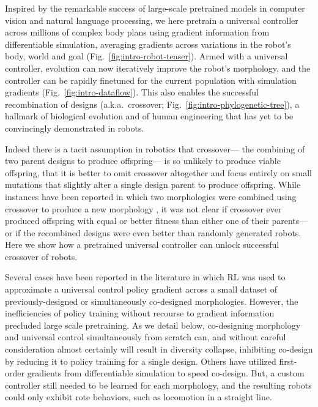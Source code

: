 Inspired by the remarkable success of large-scale pretrained models in computer vision and natural language processing, we here pretrain a universal controller across millions of complex body plans using gradient information from differentiable simulation, 
averaging gradients across variations in the robot's body, world and goal (Fig.~\ref{fig:intro-robot-teaser}).
% 
Armed with a universal controller, evolution can now iteratively improve the robot's morphology, 
and the controller can be rapidly finetuned for the current population with simulation gradients (Fig.~\ref{fig:intro-dataflow}).
This also enables the successful recombination of designs (a.k.a.~crossover; Fig.~\ref{fig:intro-phylogenetic-tree}),
a hallmark of biological evolution 
and of human engineering that has yet to be convincingly demonstrated in robots.

Indeed there is a tacit assumption in robotics 
that crossover---%
the combining of two parent designs to produce offspring---%
is so unlikely to produce viable offspring, 
that it is better to omit crossover altogether 
and focus entirely on small mutations 
that slightly alter a single design parent to produce offspring.
% 
While instances have been reported in which two morphologies were combined using crossover to produce a new morphology
\cite{sims1994competition,bongard2001repeated,hiller2010evolving,strgar2024evolution},
it was not clear if crossover ever produced offspring with equal or better fitness than either one of their parents---or if the recombined designs were even better than randomly generated robots.
Here we show how a pretrained universal controller can unlock successful crossover of robots.


Several cases have been reported in the literature in which RL was used to approximate a universal control policy gradient across a small dataset of
previously-designed 
\cite{huang2020one,gupta2022metamorph,bohlinger2024one}
or 
simultaneously co-designed \cite{wang2023preco,li2025generating}
morphologies.
However, the inefficiencies of policy training without recourse to gradient information precluded large scale pretraining.
% 
As we detail below, co-designing morphology and universal control simultaneously from scratch can, and without careful consideration almost certainly will 
result in diversity collapse, inhibiting co-design by reducing it to policy training for a single design.
%
Others
\cite{ma2021diffaqua,matthews2023efficient,yuhn20234d,cochevelou2023differentiable,strgar2024evolution}
have utilized first-order gradients from differentiable simulation 
to speed co-design.
But, a custom controller still needed to be learned for each morphology,
and the resulting robots could only exhibit rote behaviors,
such as locomotion in a straight line. 


